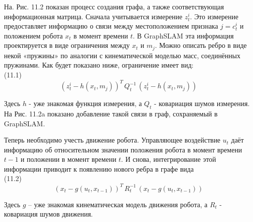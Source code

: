 \documentclass[10pt,a4paper]{article}
\begin{document}
На. Рис. 11.2 показан процесс создания графа, а также соответствующая информационная матрица. Сначала учитывается измерение $z_t^i$. Это измерение предоставляет информацию о связи между местоположением признака $j = c_t^i$ и положением робота $x_t$ в момент времени $t$. В GraphSLAM эта информация проектируется в виде ограничения между $x_t$ и $m_j$. Можно описать ребро в виде некой «пружины» по аналогии с кинематической моделью масс, соединённых пружинами. Как будет показано ниже, ограничение имеет вид:\\

(11.1)
$$(z_t^i-h(x_t,m_j))^T\,Q_t^{-1}\,(z_t^i-h(x_t,m_j))$$

Здесь $h$ - уже знакомая функция измерения, а $Q_t$ - ковариация шумов измерения. На Рис. 11.2a показано добавление такой связи в граф, сохраняемый в GraphSLAM.

Теперь необходимо учесть движение робота. Управляющее воздействие $u_t$ даёт информацию об относительном значении положения робота в момент времени $t-1$ и положении в момент времени $t$. И снова, интегрирование этой информации приводит к появлению нового ребра в графе вида\\

(11.2)
$$(x_t-g(u_t,x_{t-1}))^T\,R_t^{-1}\,(x_t-g(u_t,x_{t-1}))$$

Здесь $g$ – уже знакомая кинематическая модель движения робота, а $R_t$ - ковариация шумов движения.
\end{document}
